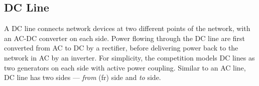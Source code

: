 \subsection{DC Line}
\label{sec:dcline}
A DC line connects network devices at two different points of the network, with an AC-DC converter on each side.
Power flowing through the DC line are first
converted from AC to DC by a rectifier, before delivering power 
back to the network in AC by an inverter.
For simplicity, the competition models DC lines as two generators 
on each side with active power coupling.
Similar to an AC line, DC line has two sides ---  \emph{from} (fr) side and \emph{to} side.
